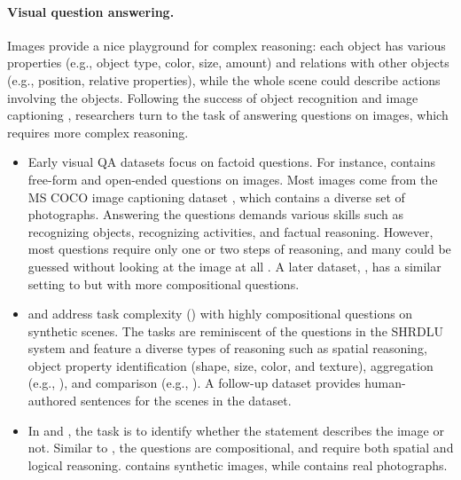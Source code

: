 \paragraph{Visual question answering.}
Images provide a nice playground for complex reasoning:
each object has various properties
(e.g., object type, color, size, amount)
and relations with other objects
(e.g., position, relative properties),
while the whole scene could describe actions
involving the objects.
Following the success of object recognition
\cite{krizhevsky2012imagenet,szegedy2015googlenet,he2016resnet}
and image captioning
\cite{farhadi2010every,lin2014microsoft,fang2015captions,mao2015deep},
researchers turn to the task of answering questions on images,
which requires more complex reasoning.

\begin{itemize}

\item Early visual QA datasets
focus on factoid questions.
For instance,  \cite{antol2015vqa}
contains free-form and open-ended questions on images.
Most images come from the MS COCO image captioning dataset
\cite{lin2014microsoft},
which contains a diverse set of photographs.
Answering the questions demands various skills
such as recognizing objects, recognizing activities,
and factual reasoning.
However, most questions require only one or two steps of reasoning,
and many could be guessed without looking at the image at all
\cite{agrawal2016analyzing,goyal2017making}.
A later dataset,  \cite{hudson2019gqa},
has a similar setting to 
but with more compositional questions.

\item {} \cite{andreas2016neural}
and  \cite{johnson2017clevr}
address task complexity (\Depth) with highly compositional questions
on synthetic scenes.
The tasks are reminiscent of the questions in the SHRDLU system
\cite{winograd1972language} and feature a diverse types of reasoning
such as spatial reasoning, object property identification
(shape, size, color, and texture),
aggregation (e.g., ),
and comparison (e.g., ).
A follow-up dataset  \cite{johnson2017inferring}
provides human-authored sentences for the scenes in the  dataset.

\item In  \cite{suhr2017nlvr} and  \cite{suhr2018nlvr2},
the task is to identify whether the statement describes the
image or not.
Similar to ,
the questions are compositional,
and require both spatial and logical reasoning.
 contains synthetic images,
while  contains real photographs.
 
\end{itemize}

